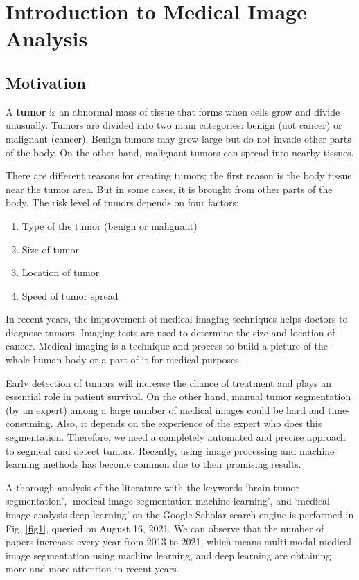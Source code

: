 \chapter{Introduction to Medical Image Analysis}
\label{sec:chap2}

\section{Motivation}
A \textbf{tumor} is an abnormal mass of tissue that forms when cells grow and divide unusually. Tumors are divided into two main categories: benign (not cancer) or malignant (cancer). Benign tumors may grow large but do not invade other parts of the body.  On the other hand, malignant tumors can spread into nearby tissues.

There are different reasons for creating tumors; the first reason is the body tissue near the tumor area. But in some cases, it is brought from other parts of the body. The risk level of tumors depends on four factors: 

\begin{enumerate}
	\item Type of the tumor (benign or malignant)
	\item Size of tumor
	\item Location of tumor
	\item Speed of tumor spread
\end{enumerate}

In recent years, the improvement of medical imaging techniques helps doctors to diagnose tumors. Imaging tests are used to determine the size and location of cancer. Medical imaging is a technique and process to build a picture of the whole human body or a part of it for medical purposes. 

Early detection of tumors will increase the chance of treatment and plays an essential role in patient survival. On the other hand, manual tumor segmentation (by an expert) among a large number of medical images could be hard and time-consuming.  Also, it depends on the experience of the expert who does this segmentation. Therefore, we need a completely automated and precise approach to segment and detect tumors. Recently, using image processing and machine learning methods has become common due to their promising results. 

A thorough analysis of the literature with the keywords ‘brain tumor segmentation’, ‘medical image segmentation machine learning’, and ‘medical image analysis deep learning’ on the Google Scholar search engine is performed in Fig. \ref{fig1}, queried on August 16, 2021. We can observe that the number of papers increases every year from 2013 to 2021, which means multi-modal medical image segmentation using machine learning, and deep learning are obtaining more and more attention in recent years. 

